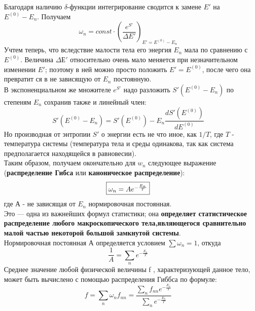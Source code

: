 Благодаря наличию $\delta$-функции интегрирование сводится к замене $E'$ на $E^{(0)} - E_n$.
Получаем
$$
\omega_n = const \cdot (\frac{e^{S'}}{\Delta E'})_{E' = E^{(0)} - E_n}
$$
Учтем теперь, что вследствие малости тела его энергия $E_n$ мала по сравнению с $E^{(0)}$. Величина $\Delta Е'$ относительно очень
мало меняется при незначительном изменении $E'$; поэтому в ней
можно просто положить $E' = E^{(0)}$, после чего она превратит­
ся в не зависящую от $E_n$ постоянную.\\
В экспоненциальном же множителе $e^{S'}$ надо разложить $S'(E^{(0)} - E_n)$ по степеням $E_n$ сохранив также и линейный член:
$$
S'(E^{(0)} - E_n) = S'(E^{(0)}) - E_n \frac{dS'	(E^{(0)})}{dE^{(0)}}
$$
Но производная от энтропии $S'$ о энергии есть не что иное,
как $1/T$, где $T$ - температура системы (температура тела и сре­ды одинакова, так как система предполагается находящейся в
равновесии).\\
Таким образом, получаем окончательно для $w_n$ следующее
выражение (\textbf{распределение Гибса} или \textbf{каноническое распределение}): 
$$
\fbox{$\omega_n = A e^{-\frac{E_n}{T}}$}
$$
где А - не зависящая от $E_n$ нормировочная постоянная.\\
Это — одна из важнейших формул статистики; она \textbf{определяет ста­тистическое распределение любого макроскопического тела,являющегося сравнительно малой частью некоторой большой замкнутой системы}.\\
Нормировочная постоянная А определяется условием $\sum \omega_n = 1$, откуда
$$
\frac{1}{A} = \sum_{n} e ^{-\frac{E_n}{T}}
$$
Среднее значение любой физической величины f , характеризую­щей данное тело, может быть вычислено с помощью распреде­ления Гиббса по формуле:
$$
f = \sum_{n} \omega_n f_{nn} = \frac{\sum_{n}f_{nn} e^{-\frac{E_n}{T}}}{\sum_{n} e^{-\frac{E_n}{T}}}
$$


